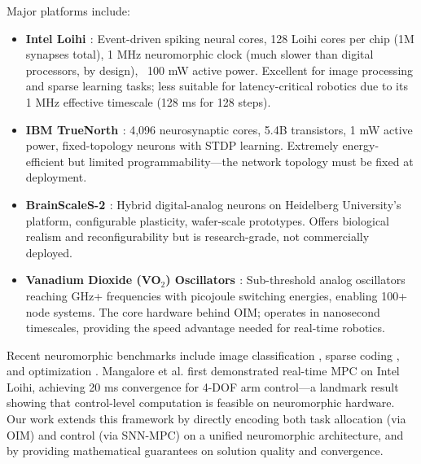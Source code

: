 Major platforms include:

\begin{itemize}
\item \textbf{Intel Loihi \cite{Davies2018}}: Event-driven spiking neural cores, 128 Loihi cores per chip (1M synapses total), 1 MHz neuromorphic clock (much slower than digital processors, by design), ~100 mW active power. Excellent for image processing and sparse learning tasks; less suitable for latency-critical robotics due to its 1 MHz effective timescale (128 ms for 128 steps).

\item \textbf{IBM TrueNorth \cite{Merolla2014}}: 4,096 neurosynaptic cores, 5.4B transistors, 1 mW active power, fixed-topology neurons with STDP learning. Extremely energy-efficient but limited programmability---the network topology must be fixed at deployment.

\item \textbf{BrainScaleS-2 \cite{Müller2023}}: Hybrid digital-analog neurons on Heidelberg University's platform, configurable plasticity, wafer-scale prototypes. Offers biological realism and reconfigurability but is research-grade, not commercially deployed.

\item \textbf{Vanadium Dioxide (VO$_2$) Oscillators \cite{Cederberg2012}}: Sub-threshold analog oscillators reaching GHz+ frequencies with picojoule switching energies, enabling 100+ node systems. The core hardware behind OIM; operates in nanosecond timescales, providing the speed advantage needed for real-time robotics.
\end{itemize}

Recent neuromorphic benchmarks include image classification \cite{Bagheri2018}, sparse coding \cite{Indiveri2015}, and optimization \cite{Mangalore2024}. Mangalore et al. \cite{Mangalore2024} first demonstrated real-time MPC on Intel Loihi, achieving 20 ms convergence for 4-DOF arm control---a landmark result showing that control-level computation is feasible on neuromorphic hardware. Our work extends this framework by directly encoding both task allocation (via OIM) and control (via SNN-MPC) on a unified neuromorphic architecture, and by providing mathematical guarantees on solution quality and convergence.


